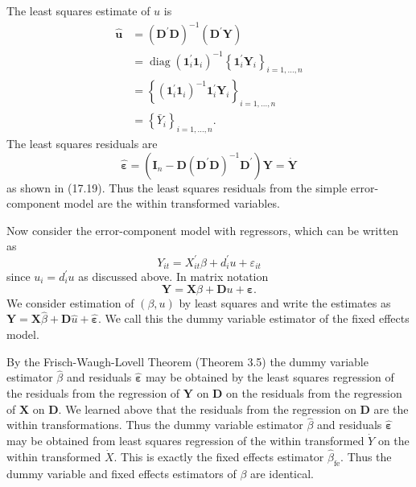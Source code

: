 \documentclass[10pt]{article}
\begin{document}
The least squares estimate of $u$ is
$$
\begin{aligned}
\widehat{\boldsymbol{u}} &=\left(\boldsymbol{D}^{\prime} \boldsymbol{D}\right)^{-1}\left(\boldsymbol{D}^{\prime} \boldsymbol{Y}\right) \\
&=\operatorname{diag}\left(\mathbf{1}_{i}^{\prime} \mathbf{1}_{i}\right)^{-1}\left\{\mathbf{1}_{i}^{\prime} \boldsymbol{Y}_{i}\right\}_{i=1, \ldots, n} \\
&=\left\{\left(\mathbf{1}_{i}^{\prime} \mathbf{1}_{i}\right)^{-1} \mathbf{1}_{i}^{\prime} \boldsymbol{Y}_{i}\right\}_{i=1, \ldots, n} \\
&=\left\{\bar{Y}_{i}\right\}_{i=1, \ldots, n} .
\end{aligned}
$$
The least squares residuals are
$$
\widehat{\boldsymbol{\varepsilon}}=\left(\boldsymbol{I}_{n}-\boldsymbol{D}\left(\boldsymbol{D}^{\prime} \boldsymbol{D}\right)^{-1} \boldsymbol{D}^{\prime}\right) \boldsymbol{Y}=\dot{\boldsymbol{Y}}
$$
as shown in (17.19). Thus the least squares residuals from the simple error-component model are the within transformed variables.

Now consider the error-component model with regressors, which can be written as
$$
Y_{i t}=X_{i t}^{\prime} \beta+d_{i}^{\prime} u+\varepsilon_{i t}
$$
since $u_{i}=d_{i}^{\prime} u$ as discussed above. In matrix notation
$$
\boldsymbol{Y}=\boldsymbol{X} \beta+\boldsymbol{D} u+\boldsymbol{\varepsilon} .
$$
We consider estimation of $(\beta, u)$ by least squares and write the estimates as $\boldsymbol{Y}=\boldsymbol{X} \widehat{\beta}+\boldsymbol{D} \widehat{u}+\widehat{\boldsymbol{\varepsilon}}$. We call this the dummy variable estimator of the fixed effects model.

By the Frisch-Waugh-Lovell Theorem (Theorem 3.5) the dummy variable estimator $\widehat{\beta}$ and residuals $\widehat{\boldsymbol{\varepsilon}}$ may be obtained by the least squares regression of the residuals from the regression of $\boldsymbol{Y}$ on $\boldsymbol{D}$ on the residuals from the regression of $\boldsymbol{X}$ on $\boldsymbol{D}$. We learned above that the residuals from the regression on $\boldsymbol{D}$ are the within transformations. Thus the dummy variable estimator $\widehat{\beta}$ and residuals $\widehat{\boldsymbol{\varepsilon}}$ may be obtained from least squares regression of the within transformed $\dot{Y}$ on the within transformed $\dot{X}$. This is exactly the fixed effects estimator $\widehat{\beta}_{\mathrm{fe}}$. Thus the dummy variable and fixed effects estimators of $\beta$ are identical.
\end{document}
